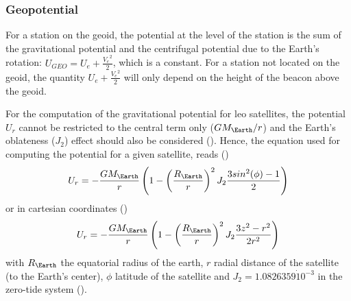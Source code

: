 \subsubsection{Geopotential}\label{sssec:doris-geopotential}
For a station on the geoid, the potential at the level of the station is the sum 
of the gravitational potential and the centrifugal potential due to the Earth's 
rotation: $U_{GEO} = U_e + \frac{{V_e}^2}{2}$, which is a constant. For a station 
not located on the geoid, the quantity $U_e + \frac{{V_e}^2}{2}$ will only depend 
on the height of the beacon above the geoid.

For the computation of the gravitational potential for \gls{leo} satellites, 
the potential $U_r$ cannot be restricted to the central term only ($GM_{\Earth} / r$) and
the Earth's oblateness ($J_2$) effect should also be considered (\cite{Larson2007}). 
Hence, the equation used for computing the potential for a given satellite, reads 
(\cite{Lemoine2016})
\begin{equation}\label{eq:lem18}
  U_r = 
    -\frac{GM_{\Earth}}{r} \left( 
      1 - 
      \left( \frac{R_{\Earth}}{r} \right) ^2 
      J_2 \frac{3 sin^2(\phi) - 1}{2} 
    \right)
\end{equation}
or in cartesian coordinates (\cite{Larson2007})
\begin{equation}
  U_r = -\frac{GM_{\Earth}}{r} \left( 1- \left(\frac{R_{\Earth}}{r}\right)^2 
    J_2 \frac{3 z^2 - r^2}{2r^2} \right)
\end{equation}
with $R_{\Earth}$ the equatorial radius of the earth, $r$ radial 
distance of the satellite (to the Earth's center), $\phi$ latitude of the 
satellite and $J_2 = 1.0826359 \dot 10^{-3}$ in the zero-tide system (\cite{iers2010}).

\iffalse
\subsubsection{True Proper Frequency of the Receiver}\label{sssec:true-proprtfrequency-of-the-receiver}
For the term $f_{r_T}$ that appears in \autoref{eq:lem13}, we need an estimate of 
$\Delta f_{r} / f_{r_N}$. This estimate can be obtained in one of the following ways 
\cite{Lemoine2016}:
\begin{enumerate}
    \item Via the field ``F'' recorded for every single measurement in the \gls{doris} 
      RINEX file (see \autoref{ssec:relative-frequency-offset}); not that this estimation 
      is not very smooth, as noticed by \cite{Gao2015} and it is advisable, before 
      using it in \autoref{eq:lem13}, to perform a linear (or polynomial) regression of 
      these estimates over one or a few days.
    \item It can be obtained from a polynomial regression over the frequency 
      offsets estimated during the passes over the master beacons
    \item It can be estimated as a by-product during a re-computation of the 
      ``timetagging'' polynomial (see \cite{Mercier2010})
\end{enumerate}
\fi

